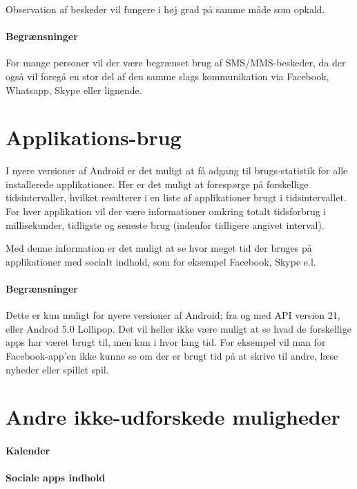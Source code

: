 Observation af beskeder vil fungere i høj grad på samme måde som opkald.

\paragraph{Begrænsninger}
For mange personer vil der være begrænset brug af SMS/MMS-beskeder, da der også vil foregå en stor del af den samme slags kommunikation via Facebook, Whatsapp, Skype eller lignende.

\section{Applikations-brug}
I nyere versioner af Android er det muligt at få adgang til brugs-statistik for alle installerede applikationer.
Her er det muligt at forespørge på forskellige tidsintervaller, hvilket resulterer i en liste af applikationer brugt i tidsintervallet.
For hver applikation vil der være informationer omkring totalt tidsforbrug i millisekunder, tidligste og seneste brug (indenfor tidligere angivet interval).

Med denne information er det muligt at se hvor meget tid der bruges på applikationer med socialt indhold, som for eksempel Facebook, Skype e.l.

\paragraph{Begrænsninger}
Dette er kun muligt for nyere versioner af Android; fra og med API version 21, eller Androd 5.0 Lollipop.
Det vil heller ikke være muligt at se hvad de forskellige apps har været brugt til, men kun i hvor lang tid.
For eksempel vil man for Facebook-app'en ikke kunne se om der er brugt tid på at skrive til andre, læse nyheder eller spillet spil.

\section{Andre ikke-udforskede muligheder}

\paragraph{Kalender}

\paragraph{Sociale apps indhold}
